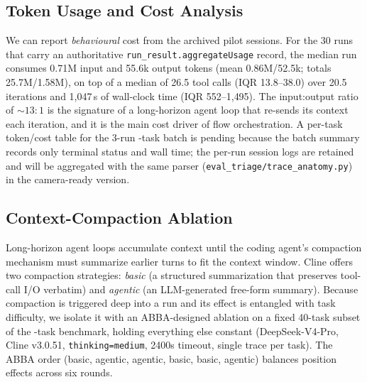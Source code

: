 \subsection{Token Usage and Cost Analysis}
\label{sec:token-cost}

We can report \emph{behavioural} cost from the archived pilot sessions. For the 30
runs that carry an authoritative \texttt{run\_result.aggregateUsage} record, the
median run consumes 0.71M input and 55.6k output tokens (mean 0.86M/52.5k; totals
25.7M/1.58M), on top of a median of 26.5 tool calls (IQR 13.8--38.0) over 20.5
iterations and 1{,}047\,s of wall-clock time (IQR 552--1{,}495). The input:output
ratio of ${\sim}13{:}1$ is the signature of a long-horizon agent loop that re-sends
its context each iteration, and it is the main cost driver of flow orchestration.
A per-task token/cost table for the 3-run \Ncases{}-task batch is pending because the
batch summary records only terminal status and wall time; the per-run session logs
are retained and will be aggregated with the same parser
(\texttt{eval\_triage/trace\_anatomy.py}) in the camera-ready version.

\subsection{Context-Compaction Ablation}
\label{sec:compaction-ablation}

Long-horizon agent loops accumulate context until the coding agent's compaction
mechanism must summarize earlier turns to fit the context window. Cline offers
two compaction strategies: \emph{basic} (a structured summarization that
preserves tool-call I/O verbatim) and \emph{agentic} (an LLM-generated free-form
summary). Because compaction is triggered deep into a run and its effect is
entangled with task difficulty, we isolate it with an ABBA-designed ablation on
a fixed 40-task subset of the \Ncases{}-task benchmark, holding everything else constant
(DeepSeek-V4-Pro, Cline v3.0.51, \texttt{thinking=medium}, 2400s timeout, single
trace per task). The ABBA order (basic, agentic, agentic, basic, basic, agentic)
balances position effects across six rounds.

